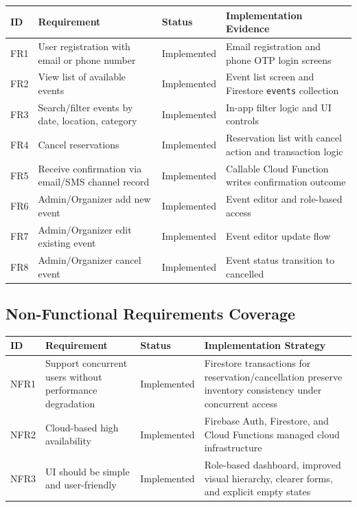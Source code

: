 \documentclass[12pt,a4paper]{article}
\begin{document}
\begin{longtable}{p{0.7cm}p{7.2cm}p{2.5cm}p{4.2cm}}
\toprule
\textbf{ID} & \textbf{Requirement} & \textbf{Status} & \textbf{Implementation Evidence} \\
\midrule
FR1 & User registration with email or phone number & Implemented & Email registration and phone OTP login screens \\
FR2 & View list of available events & Implemented & Event list screen and Firestore \texttt{events} collection \\
FR3 & Search/filter events by date, location, category & Implemented & In-app filter logic and UI controls \\
FR4 & Cancel reservations & Implemented & Reservation list with cancel action and transaction logic \\
FR5 & Receive confirmation via email/SMS channel record & Implemented & Callable Cloud Function writes confirmation outcome \\
FR6 & Admin/Organizer add new event & Implemented & Event editor and role-based access \\
FR7 & Admin/Organizer edit existing event & Implemented & Event editor update flow \\
FR8 & Admin/Organizer cancel event & Implemented & Event status transition to cancelled \\
\bottomrule
\end{longtable}

\subsection{Non-Functional Requirements Coverage}

\begin{longtable}{p{0.7cm}p{6.7cm}p{2.4cm}p{4.8cm}}
\toprule
\textbf{ID} & \textbf{Requirement} & \textbf{Status} & \textbf{Implementation Strategy} \\
\midrule
NFR1 & Support concurrent users without performance degradation & Implemented & Firestore transactions for reservation/cancellation preserve inventory consistency under concurrent access \\
NFR2 & Cloud-based high availability & Implemented & Firebase Auth, Firestore, and Cloud Functions managed cloud infrastructure \\
NFR3 & UI should be simple and user-friendly & Implemented & Role-based dashboard, improved visual hierarchy, clearer forms, and explicit empty states \\
\bottomrule
\end{longtable}
\end{document}
